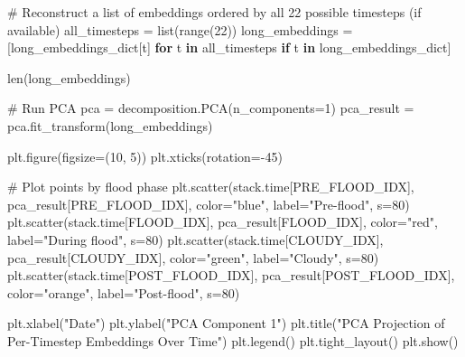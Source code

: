 \documentclass[
  letterpaper,
  DIV=11,
  numbers=noendperiod]{scrreprt}
\newenvironment{Shaded}{\begin{snugshade}}{\end{snugshade}}
\newcommand{\BuiltInTok}[1]{\textcolor[rgb]{0.00,0.23,0.31}{#1}}
\newcommand{\CommentTok}[1]{\textcolor[rgb]{0.37,0.37,0.37}{#1}}
\newcommand{\ControlFlowTok}[1]{\textcolor[rgb]{0.00,0.23,0.31}{\textbf{#1}}}
\newcommand{\DecValTok}[1]{\textcolor[rgb]{0.68,0.00,0.00}{#1}}
\newcommand{\KeywordTok}[1]{\textcolor[rgb]{0.00,0.23,0.31}{\textbf{#1}}}
\newcommand{\NormalTok}[1]{\textcolor[rgb]{0.00,0.23,0.31}{#1}}
\newcommand{\OperatorTok}[1]{\textcolor[rgb]{0.37,0.37,0.37}{#1}}
\newcommand{\StringTok}[1]{\textcolor[rgb]{0.13,0.47,0.30}{#1}}
\begin{document}
\begin{Shaded}
\begin{Highlighting}[]
\CommentTok{\# Reconstruct a list of embeddings ordered by all 22 possible timesteps (if available)}
\NormalTok{all\_timesteps }\OperatorTok{=} \BuiltInTok{list}\NormalTok{(}\BuiltInTok{range}\NormalTok{(}\DecValTok{22}\NormalTok{))}
\NormalTok{long\_embeddings }\OperatorTok{=}\NormalTok{ [long\_embeddings\_dict[t] }\ControlFlowTok{for}\NormalTok{ t }\KeywordTok{in}\NormalTok{ all\_timesteps }\ControlFlowTok{if}\NormalTok{ t }\KeywordTok{in}\NormalTok{ long\_embeddings\_dict]}
\end{Highlighting}
\end{Shaded}

\begin{Shaded}
\begin{Highlighting}[]
\BuiltInTok{len}\NormalTok{(long\_embeddings)}
\end{Highlighting}
\end{Shaded}

\begin{Shaded}
\begin{Highlighting}[]
\CommentTok{\# Run PCA}
\NormalTok{pca }\OperatorTok{=}\NormalTok{ decomposition.PCA(n\_components}\OperatorTok{=}\DecValTok{1}\NormalTok{)}
\NormalTok{pca\_result }\OperatorTok{=}\NormalTok{ pca.fit\_transform(long\_embeddings)}

\NormalTok{plt.figure(figsize}\OperatorTok{=}\NormalTok{(}\DecValTok{10}\NormalTok{, }\DecValTok{5}\NormalTok{))}
\NormalTok{plt.xticks(rotation}\OperatorTok{={-}}\DecValTok{45}\NormalTok{)}

\CommentTok{\# Plot points by flood phase}
\NormalTok{plt.scatter(stack.time[PRE\_FLOOD\_IDX], pca\_result[PRE\_FLOOD\_IDX], color}\OperatorTok{=}\StringTok{"blue"}\NormalTok{, label}\OperatorTok{=}\StringTok{"Pre{-}flood"}\NormalTok{, s}\OperatorTok{=}\DecValTok{80}\NormalTok{)}
\NormalTok{plt.scatter(stack.time[FLOOD\_IDX], pca\_result[FLOOD\_IDX], color}\OperatorTok{=}\StringTok{"red"}\NormalTok{, label}\OperatorTok{=}\StringTok{"During flood"}\NormalTok{, s}\OperatorTok{=}\DecValTok{80}\NormalTok{)}
\NormalTok{plt.scatter(stack.time[CLOUDY\_IDX], pca\_result[CLOUDY\_IDX], color}\OperatorTok{=}\StringTok{"green"}\NormalTok{, label}\OperatorTok{=}\StringTok{"Cloudy"}\NormalTok{, s}\OperatorTok{=}\DecValTok{80}\NormalTok{)}
\NormalTok{plt.scatter(stack.time[POST\_FLOOD\_IDX], pca\_result[POST\_FLOOD\_IDX], color}\OperatorTok{=}\StringTok{"orange"}\NormalTok{, label}\OperatorTok{=}\StringTok{"Post{-}flood"}\NormalTok{, s}\OperatorTok{=}\DecValTok{80}\NormalTok{)}

\NormalTok{plt.xlabel(}\StringTok{"Date"}\NormalTok{)}
\NormalTok{plt.ylabel(}\StringTok{"PCA Component 1"}\NormalTok{)}
\NormalTok{plt.title(}\StringTok{"PCA Projection of Per{-}Timestep Embeddings Over Time"}\NormalTok{)}
\NormalTok{plt.legend()}
\NormalTok{plt.tight\_layout()}
\NormalTok{plt.show()}
\end{Highlighting}
\end{Shaded}
\end{document}
